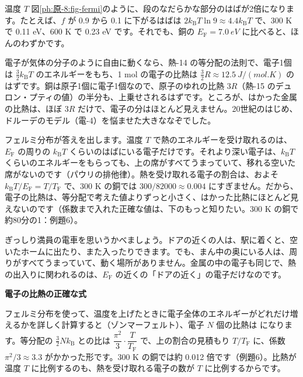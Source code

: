 \begin{phbaisuru}{温度 $T$}
図\ref{ph:原-8:fig-fermi}のように、段のなだらかな部分のはばが2倍になります。たとえば、$f$ が 0.9 から 0.1 に下がるはばは $2k_{\mathrm B}T\ln9\approx4.4k_{\mathrm B}T$ で、300 K で 0.11 eV、600 K で 0.23 eV です。それでも、銅の $E_{\mathrm F}=\qty{7.0}{eV}$ に比べると、ほんのわずかです。
\end{phbaisuru}

\label{ph:原-8:sec6}
電子が気体の分子のように自由に動くなら、熱-14 の等分配の法則で、電子1個は $\tfrac32k_{\mathrm B}T$ のエネルギーをもち、1 mol の電子の比熱は $\tfrac32R\approx\qty{12.5}{J/(mol.K)}$ のはずです。銅は原子1個に電子1個なので、原子のゆれの比熱 $3R$（熱-15 のデュロン・プティの値）の半分も、上乗せされるはずです。ところが、はかった金属の比熱は、ほぼ $3R$ だけで、電子の分はほとんど見えません。20世紀のはじめ、ドルーデのモデル（電-4）を悩ませた大きななぞでした。

フェルミ分布が答えを出します。温度 $T$ で熱のエネルギーを受け取れるのは、$E_{\mathrm F}$ の周りの $k_{\mathrm B}T$ くらいのはばにいる電子だけです。それより深い電子は、$k_{\mathrm B}T$ くらいのエネルギーをもらっても、上の席がすべてうまっていて、移れる空いた席がないのです（パウリの排他律）。熱を受け取れる電子の割合は、およそ $k_{\mathrm B}T/E_{\mathrm F}=T/T_{\mathrm F}$ で、300 K の銅では $300/\num{82000}\approx0.004$ にすぎません。だから、電子の比熱は、等分配で考えた値よりずっと小さく、はかった比熱にほとんど見えないのです（係数まで入れた正確な値は、下のもっと知りたい。300 K の銅で約80分の1：例題6）。

\begin{phmijika}
ぎっしり満員の電車を思いうかべましょう。ドアの近くの人は、駅に着くと、空いたホームに出たり、また入ったりできます。でも、まん中の奥にいる人は、周りがすべてうまっていて、動く場所がありません。金属の中の電子も同じで、熱の出入りに関われるのは、$E_{\mathrm F}$ の近くの「ドアの近く」の電子だけなのです。
\end{phmijika}

\begin{motto}[4]
\textbf{電子の比熱の正確な式}\par
フェルミ分布を使って、温度を上げたときに電子全体のエネルギーがどれだけ増えるかを詳しく計算すると（ゾンマーフェルト）、電子 $N$ 個の比熱は
\label{ph:原-8:Cel}になります。等分配の $\tfrac32Nk_{\mathrm B}$ との比は $\dfrac{\pi^2}{3}\cdot\dfrac{T}{T_{\mathrm F}}$ で、上の割合の見積もり $T/T_{\mathrm F}$ に、係数 $\pi^2/3\approx3.3$ がかかった形です。300 K の銅では約 0.012 倍です（例題6）。比熱が温度 $T$ に比例するのも、熱を受け取れる電子の数が $T$ に比例するからです。
\end{motto}

